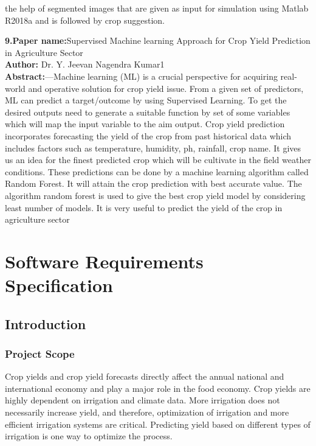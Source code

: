 \documentclass[oneside,a4paper,12pt]{report}
\begin{document}
the help of segmented images that are given as input for 
simulation using Matlab R2018a and is followed by crop 
suggestion. 
\\
\newpage
\item \textbf{9.Paper name:}Supervised Machine learning Approach for 
Crop Yield Prediction in Agriculture Sector\\
\textbf{Author:} Dr. Y. Jeevan Nagendra Kumar1\\
\textbf{Abstract:}—Machine learning (ML) is a crucial perspective 
for acquiring real-world and operative solution for crop 
yield issue. From a given set of predictors, ML can 
predict a target/outcome by using Supervised Learning. 
To get the desired outputs need to generate a suitable 
function by set of some variables which will map the 
input variable to the aim output. Crop yield prediction 
incorporates forecasting the yield of the crop from past 
historical data which includes factors such as 
temperature, humidity, ph, rainfall, crop name. It gives 
us an idea for the finest predicted crop which will be 
cultivate in the field weather conditions. These 
predictions can be done by a machine learning 
algorithm called Random Forest. It will attain the crop 
prediction with best accurate value. The algorithm 
random forest is used to give the best crop yield model 
by considering least number of models. It is very useful 
to predict the yield of the crop in agriculture sector\\


\chapter{Software Requirements Specification}
\section{Introduction}
\subsection{Project Scope}
\item Crop yields and crop yield forecasts directly affect the annual national and international economy and play a major role in the food economy. Crop yields are highly
dependent on irrigation and climate data. More irrigation does not necessarily increase
yield, and therefore, optimization of irrigation and more efficient irrigation systems
are critical. Predicting yield based on different types of irrigation is one way to optimize
the process.
\end{document}
